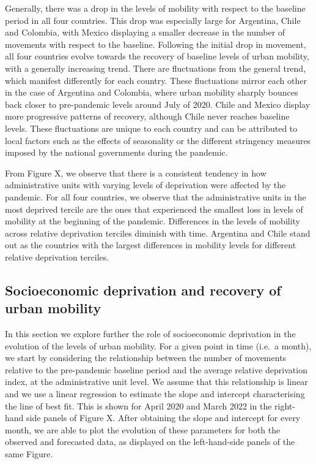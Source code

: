 \documentclass[
  11pt,
]{article}
\begin{document}
Generally, there was a drop in the levels of mobility with respect to
the baseline period in all four countries. This drop was especially
large for Argentina, Chile and Colombia, with Mexico displaying a
smaller decrease in the number of movements with respect to the
baseline. Following the initial drop in movement, all four countries
evolve towards the recovery of baseline levels of urban mobility, with a
generally increasing trend. There are fluctuations from the general
trend, which manifest differently for each country. These fluctuations
mirror each other in the case of Argentina and Colombia, where urban
mobility sharply bounces back closer to pre-pandemic levels around July
of 2020. Chile and Mexico display more progressive patterns of recovery,
although Chile never reaches baseline levels. These fluctuations are
unique to each country and can be attributed to local factors such as
the effects of seasonality or the different stringency measures imposed
by the national governments during the pandemic.

From Figure X, we observe that there is a consistent tendency in how
administrative units with varying levels of deprivation were affected by
the pandemic. For all four countries, we observe that the administrative
units in the most deprived tercile are the ones that experienced the
smallest loss in levels of mobility at the beginning of the pandemic.
Differences in the levels of mobility across relative deprivation
terciles diminish with time. Argentina and Chile stand out as the
countries with the largest differences in mobility levels for different
relative deprivation terciles.

\hypertarget{socioeconomic-deprivation-and-recovery-of-urban-mobility}{%
\subsection{Socioeconomic deprivation and recovery of urban
mobility}\label{socioeconomic-deprivation-and-recovery-of-urban-mobility}}

In this section we explore further the role of socioeconomic deprivation
in the evolution of the levels of urban mobility. For a given point in
time (i.e.~a month), we start by considering the relationship between
the number of movements relative to the pre-pandemic baseline period and
the average relative deprivation index, at the administrative unit
level. We assume that this relationship is linear and we use a linear
regression to estimate the slope and intercept characterising the line
of best fit. This is shown for April 2020 and March 2022 in the
right-hand side panels of Figure X. After obtaining the slope and
intercept for every month, we are able to plot the evolution of these
parameters for both the observed and forecasted data, as displayed on
the left-hand-side panels of the same Figure.
\end{document}
